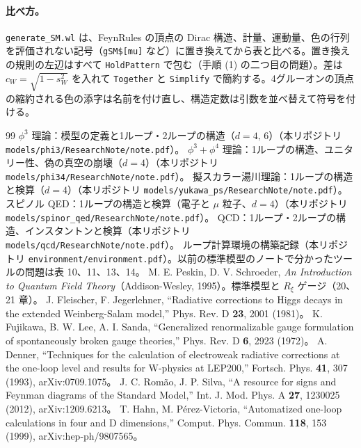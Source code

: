 \documentclass[a4paper,10pt]{ltjsarticle}
\newcommand{\sw}{s_W}
\newcommand{\cw}{c_W}
\begin{document}
\paragraph{比べ方。}\texttt{generate\_SM.wl} は、FeynRules の頂点の Dirac 構造、計量、運動量、色の行列を評価されない記号（\texttt{gSM\$[mu]} など）に置き換えてから表と比べる。置き換えの規則の左辺はすべて \texttt{HoldPattern} で包む（手順 (1) の二つ目の問題）。差は $\cw=\sqrt{1-\sw^2}$ を入れて \texttt{Together} と \texttt{Simplify} で簡約する。4グルーオンの頂点の縮約される色の添字は名前を付け直し、構造定数は引数を並べ替えて符号を付ける。

\begin{thebibliography}{99}
 $\phi^3$ 理論：模型の定義と1ループ・2ループの構造（$d=4,\,6$）（本リポジトリ \nolinkurl{models/phi3/ResearchNote/note.pdf}）。
 $\phi^3+\phi^4$ 理論：1ループの構造、ユニタリー性、偽の真空の崩壊（$d=4$）（本リポジトリ \nolinkurl{models/phi34/ResearchNote/note.pdf}）。
 擬スカラー湯川理論：1ループの構造と検算（$d=4$）（本リポジトリ \nolinkurl{models/yukawa_ps/ResearchNote/note.pdf}）。
 スピノル QED：1ループの構造と検算（電子と $\mu$ 粒子、$d=4$）（本リポジトリ \nolinkurl{models/spinor_qed/ResearchNote/note.pdf}）。
 QCD：1ループ・2ループの構造、インスタントンと検算（本リポジトリ \nolinkurl{models/qcd/ResearchNote/note.pdf}）。
 ループ計算環境の構築記録（本リポジトリ \nolinkurl{environment/environment.pdf}）。以前の標準模型のノートで分かったツールの問題は表 10、11、13、14。
 M. E. Peskin, D. V. Schroeder, \textit{An Introduction to Quantum Field Theory}（Addison-Wesley, 1995）。標準模型と $R_\xi$ ゲージ（20、21 章）。
 J. Fleischer, F. Jegerlehner, ``Radiative corrections to Higgs decays in the extended Weinberg-Salam model,'' Phys. Rev. D \textbf{23}, 2001 (1981)。
 K. Fujikawa, B. W. Lee, A. I. Sanda, ``Generalized renormalizable gauge formulation of spontaneously broken gauge theories,'' Phys. Rev. D \textbf{6}, 2923 (1972)。
 A. Denner, ``Techniques for the calculation of electroweak radiative corrections at the one-loop level and results for W-physics at LEP200,'' Fortsch. Phys. \textbf{41}, 307 (1993), arXiv:0709.1075。
 J. C. Romão, J. P. Silva, ``A resource for signs and Feynman diagrams of the Standard Model,'' Int. J. Mod. Phys. A \textbf{27}, 1230025 (2012), arXiv:1209.6213。
 T. Hahn, M. Pérez-Victoria, ``Automatized one-loop calculations in four and D dimensions,'' Comput. Phys. Commun. \textbf{118}, 153 (1999), arXiv:hep-ph/9807565。

\end{thebibliography}
\end{document}
